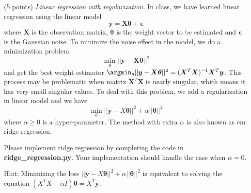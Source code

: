 \documentclass[a4paper, 12pt]{exam}
\begin{document}
	\begin{questions}
		\question (5 points) \emph{Linear regression with regularization.} In class, we have learned linear regression using the linear model
		\begin{equation*}
		\bm{y} = \bm{X}\bm{\theta} + \bm{\epsilon}
		\end{equation*}
		where $\bm{X}$ is the observation matrix,
		$\bm{\theta}$ is the weight vector to be estimated and $\bm{\epsilon}$ is the Gaussian noise. To minimize the noise effect in the model, we do a minimization problem
		\begin{equation*}
		\min_{\theta}||\bm{y} - \bm{X}\bm{\theta}||^2
		\end{equation*}
		and get the best weight estimator
		$\argmin_{\theta}||\bm{y} - \bm{X}\bm{\theta}||^2 = (\bm{X}^T\bm{X})^{-1}\bm{X}^T\bm{y}$. This process may be problematic when matrix $\bm{X}^T\bm{X}$ is nearly singular, which means it has very small singular values. %
		To deal with this problem, we add a regularization in linear model and we have
		\begin{equation*}
		\min_{\theta} ||\bm{y} - X\bm{\theta}||^2 + \alpha ||\bm{\theta}||^2
		\end{equation*}
		where $\alpha \geq 0$ is a hyper-parameter. The method with extra $\alpha$ is also known as {em ridge regression}.
		
		Please implement ridge regression  by completing the code in  \textbf{ridge\_regression.py}.
		Your implementation should handle the case when $\alpha=0$.
		
		Hint: Minimizing the loss $||\bm{y} - X\bm{\theta}||^2 + \alpha ||\bm{\theta}||^2$ is equivalent to solving the equation
		$( X^T X+ \alpha I)\bm{\theta}  = X^T \bm{y}$.
		

\end{questions}
\end{document}
